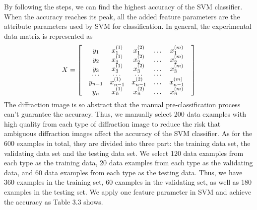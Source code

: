 By following the steps, we can find the highest accuracy of the SVM classifier. When the accuracy reaches its peak, all the added feature parameters are the attribute parameters used by SVM for classification. In general, the experimental data matrix is represented as 
\begin{align*}
X = 
\renewcommand{\arraystretch}{0.5}
\begin{bmatrix}
 & y_1 & x_1^{(1)} & x_1^{(2)} & $\ldots$ & x_1^{(m)} & \\
 & y_2 & x_2^{(1)} & x_2^{(2)} & $\ldots$ & x_2^{(m)} &\\
 & y_3 & x_3^{(1)} & x_3^{(2)} & $\ldots$ & x_3^{(m)} &\\
 & $\ldots$ & $\ldots$ & $\ldots$ & $\ldots$\\
 & y_{n-1} & x_{n-1}^{(1)} & x_{n-1}^{(2)} & $\ldots$ & x_{n-1}^{(m)} &\\
 & y_n & x_n^{(1)} & x_n^{(2)} & $\ldots$ & x_n^{(m)} &\\
\end{bmatrix}
\end{align*}
The diffraction image is so abstract that the manual pre-classification process can't guarantee the accuracy. Thus, we manually select 200 data examples with high quality from each type of diffraction image to reduce the risk that ambiguous diffraction images affect the accuracy of the SVM classifier. As for the 600 examples in total, they are divided into three part: the training data set, the validating data set and the testing data set. We select 120 data examples from each type as the training data, 20 data examples from each type as the validating data, and 60 data examples from each type as the testing data. Thus, we have 360 examples in the training set, 60 examples in the validating set, as well as 180 examples in the testing set. We apply one feature parameter in SVM and achieve the accuracy as Table 3.3 shows.  
